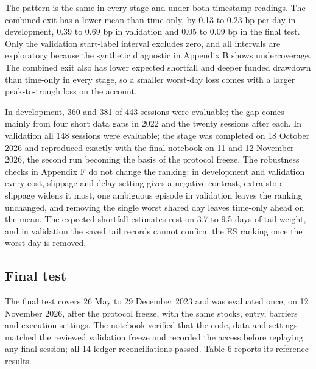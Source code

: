 \documentclass[11pt,a4paper]{article}
\begin{document}
The pattern is the same in every stage and under both timestamp readings. The combined exit has a lower mean than time-only, by 0.13 to 0.23 bp per day in development, 0.39 to 0.69 bp in validation and 0.05 to 0.09 bp in the final test. Only the validation start-label interval excludes zero, and all intervals are exploratory because the synthetic diagnostic in Appendix B shows undercoverage. The combined exit also has lower expected shortfall and deeper funded drawdown than time-only in every stage, so a smaller worst-day loss comes with a larger peak-to-trough loss on the account.

In development, 360 and 381 of 443 sessions were evaluable; the gap comes mainly from four short data gaps in 2022 and the twenty sessions after each. In validation all 148 sessions were evaluable; the stage was completed on 18 October 2026 and reproduced exactly with the final notebook on 11 and 12 November 2026, the second run becoming the basis of the protocol freeze. The robustness checks in Appendix F do not change the ranking: in development and validation every cost, slippage and delay setting gives a negative contrast, extra stop slippage widens it most, one ambiguous episode in validation leaves the ranking unchanged, and removing the single worst shared day leaves time-only ahead on the mean. The expected-shortfall estimates rest on 3.7 to 9.5 days of tail weight, and in validation the saved tail records cannot confirm the ES ranking once the worst day is removed.

\subsection*{Final test}

The final test covers 26 May to 29 December 2023 and was evaluated once, on 12 November 2026, after the protocol freeze, with the same stocks, entry, barriers and execution settings. The notebook verified that the code, data and settings matched the reviewed validation freeze and recorded the access before replaying any final session; all 14 ledger reconciliations passed. Table 6 reports its reference results.
\end{document}
